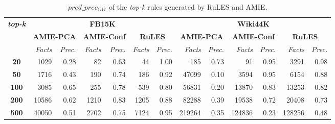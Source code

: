 \setlength\tabcolsep{0.2em}
\begin{table}[t]
\scriptsize
\centering
\begin{tabular}{c|r r|r r|r r|r r|r r|r r}

 \multirow{3}{*}{\textbf{\textit{top-k}}}&\multicolumn{6}{|c}{\textbf{FB15K}} & \multicolumn{6}{|c}{\textbf{Wiki44K}}\\
 \cmidrule{2-13}&\multicolumn{2}{|c}{\textbf{AMIE-PCA}}&\multicolumn{2}{|c|}{\textbf{AMIE-Conf}}&\multicolumn{2}{|c}{\textbf{RuLES}}&\multicolumn{2}{|c}{\textbf{AMIE-PCA}}&\multicolumn{2}{|c}{\textbf{AMIE-Conf}}&\multicolumn{2}{|c}{\textbf{RuLES}} \\
 & \textit{Facts} & \textit{Prec.} & \textit{Facts} & \textit{Prec.} & \textit{Facts} & \textit{Prec.} &\textit{Facts} & \textit{Prec.} &\textit{Facts} & \textit{Prec.} &\textit{Facts} & \textit{Prec.} \\
 \midrule
 \textbf{20} & 1029 & 0.28 & 82 & 0.63 & 44 & 1.00 & 185 & 0.73 & 91 & 0.95 & 3291 & 0.98\\
 \textbf{50} & 1716 & 0.43 & 190 & 0.74 & 186 & 0.92 & 47099 & 0.10 & 3594 & 0.95 & 6154 & 0.88 \\
\textbf{100} & 3085 & 0.65 & 255 & 0.78 & 539 & 0.80 & 56831 & 0.20 & 13870 & 0.83 & 13253 & 0.82 \\
\textbf{200} & 10586 & 0.62 & 1210 & 0.83 & 1205 & 0.88 & 82288 & 0.39 & 19538 & 0.72 & 20408 & 0.73 \\
\textbf{500} & 40050 & 0.51 & 2702 & 0.75 & 7124 & 0.95 & 219264 & 0.35 & 124836 & 0.23 & 128256 & 0.48 \\
 \bottomrule
\end{tabular}
\caption{$pred\_prec_{OW}$ of the \textit{top-k} rules generated by RuLES and AMIE.}
\label{table:amie_vs_RuLES}
\vspace*{-3mm}
\end{table}
